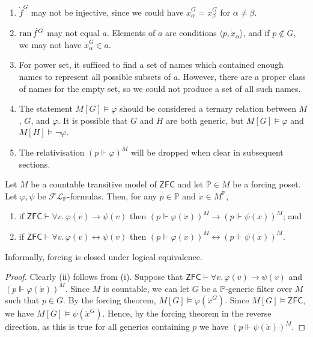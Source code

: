 \begin{remark}
    \begin{enumerate}
        \item \( \dot f^G \) may not be injective, since we could have \( \dot x_\alpha^G = \dot x_\beta^G \) for \( \alpha \neq \beta \).
        \item \( \operatorname{ran} \dot f^G \) may not equal \( a \).
        Elements of \( \dot a \) are conditions \( \langle p, \dot x_\alpha \rangle \), and if \( p \notin G \), we may not have \( \dot x_\alpha^G \in a \).
        \item For power set, it sufficed to find a set of names which contained enough names to represent all possible subsets of \( a \).
        However, there are a proper class of names for the empty set, so we could not produce a set of all such names.
        \item The statement \( M[G] \vDash \varphi \) should be considered a ternary relation between \( M \), \( G \), and \( \varphi \).
        It is possible that \( G \) and \( H \) are both generic, but \( M[G] \vDash \varphi \) and \( M[H] \vDash \neg\varphi \).
        \item The relativisation \( (p \Vdash \varphi)^M \) will be dropped when clear in subsequent sections.
    \end{enumerate}
\end{remark}
\begin{lemma}
    Let \( M \) be a countable transitive model of \( \mathsf{ZFC} \) and let \( \mathbb P \in M \) be a forcing poset.
    Let \( \varphi, \psi \) be \( \mathcal{FL}_{\mathbb P} \)-formulas.
    Then, for any \( p \in \mathbb P \) and \( \dot x \in M^{\mathbb P} \),
    \begin{enumerate}
        \item if \( \mathsf{ZFC} \vdash \forall v.\, \varphi(v) \to \psi(v) \) then \( (p \Vdash \varphi(\dot x))^M \to (p \Vdash \psi(\dot x))^M \); and
        \item if \( \mathsf{ZFC} \vdash \forall v.\, \varphi(v) \leftrightarrow \psi(v) \) then \( (p \Vdash \varphi(\dot x))^M \leftrightarrow (p \Vdash \psi(\dot x))^M \).
    \end{enumerate}
\end{lemma}
Informally, forcing is closed under logical equivalence.
\begin{proof}
    Clearly (ii) follows from (i).
    Suppose that \( \mathsf{ZFC} \vdash \forall v.\, \varphi(v) \to \psi(v) \) and \( (p \Vdash \varphi(\dot x))^M \).
    Since \( M \) is countable, we can let \( G \) be a \( \mathbb P \)-generic filter over \( M \) such that \( p \in G \).
    By the forcing theorem, \( M[G] \vDash \varphi(\dot x^G) \).
    Since \( M[G] \vDash \mathsf{ZFC} \), we have \( M[G] \vDash \psi(\dot x^G) \).
    Hence, by the forcing theorem in the reverse direction, as this is true for all generics containing \( p \) we have \( (p \Vdash \psi(\dot x))^M \).
\end{proof}
